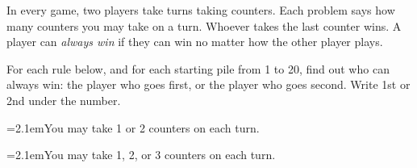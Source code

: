 

\newcommand{\bsize}{\fontsize{13}{18.5}\selectfont}
\newcommand{\blank}[1]{\rule[-0.15em]{#1}{0.5pt}}
\newcommand{\subq}[2]{\par\hangindent=2.1em\hangafter=0\makebox[0pt][r]{#1\hspace{0.6em}}#2\par}
\newcommand{\circles}{\begin{center}\circlestrip{1}{24}{12}{1.42}{1.05}\end{center}}

\newcommand{\pgrid}[2]{%
  \begin{tikzpicture}
    \fill[black!30] (0,0) rectangle (#2,#2);
    \pgfmathsetmacro{\gs}{(#1+1)*#2}
    \draw[line width=0.6pt] (0,0) grid[step=#2] (\gs,\gs);
    \foreach \k in {0,...,#1}{
      \node[font=\fontsize{11}{11}\selectfont, anchor=base] at ({(\k+0.5)*#2},-0.45) {\k};
      \node[font=\fontsize{11}{11}\selectfont, anchor=east] at (-0.08,{(\k+0.5)*#2}) {\k};
    }
    \node[font=\fontsize{12}{12}\selectfont] at ({\gs/2},-0.95) {counters in the first pile};
    \node[font=\fontsize{12}{12}\selectfont, rotate=90] at (-0.85,{\gs/2}) {counters in the second pile};
  \end{tikzpicture}}


\bsize

In every game, two players take turns taking counters. Each problem says how many counters you may take on a turn. Whoever takes the last counter wins. A player can \emph{always win} if they can win no matter how the other player plays.

\vspace{8mm}
 For each rule below, and for each starting pile from 1 to 20, find out who can always win: the player who goes first, or the player who goes second. Write 1st or 2nd under the number.

\vspace{5mm}
\subq{(a)}{You may take 1 or 2 counters on each turn.}
\vspace{1mm}
\begin{center}\end{center}

\vspace{5mm}
\subq{(b)}{You may take 1, 2, or 3 counters on each turn.}
\vspace{1mm}
\begin{center}\end{center}

